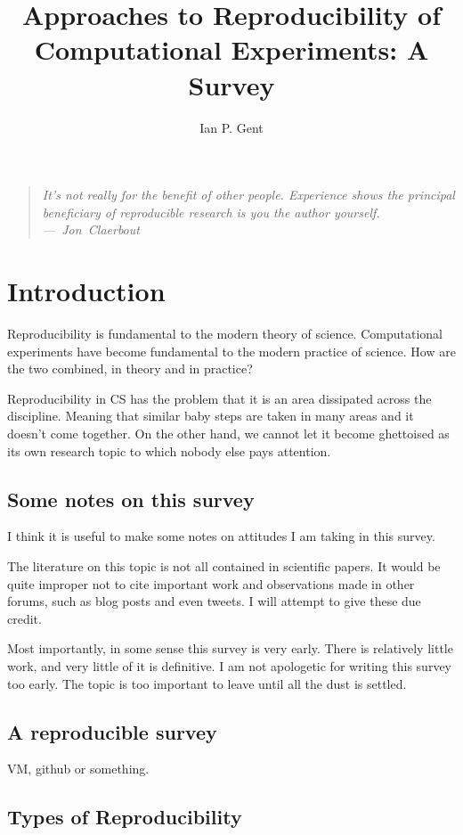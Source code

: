 \documentclass[11pt]{article}
\title{Approaches to Reproducibility of Computational Experiments: A Survey}
\author{Ian P. Gent}
\begin{document}
\maketitle
\begin{quote}
\textit{It's not really for the benefit of other people. Experience shows the principal beneficiary of reproducible research is you the author yourself. \hfill ---~Jon~Claerbout}
\end{quote} 
	
\section{Introduction}
Reproducibility is fundamental to the modern theory of science.
Computational experiments have become fundamental to the modern practice of science. How are the two combined, in theory and in practice? 

Reproducibility in CS has the problem that it is an area dissipated across the discipline. Meaning that similar baby steps are taken in many areas and it doesn't come together. On the other hand, we cannot let it become ghettoised as its own research topic to which nobody else pays attention.

\subsection{Some notes on this survey}

I think it is useful to make some notes on attitudes I am taking in this survey. 

The literature on this topic is not all contained in scientific papers. It would be quite improper not to cite important work and observations made in other forums, such as blog posts and even tweets. I will attempt to give these due credit. 

Most importantly, in some sense this survey is very early. There is relatively little work, and very little of it is definitive. I am not apologetic for writing this survey too early. The topic is too important to leave until all the dust is settled.  

\subsection{A reproducible survey}

VM, github or something.

\subsection{Types of Reproducibility}
\end{document}
